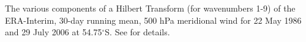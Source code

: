\label{fig:example_figure}
The various components of a Hilbert Transform (for wavenumbers 1-9) of the ERA-Interim, 30-day running mean, 500 hPa meridional wind for 22 May 1986 and 29 July 2006 at 54.75$^{\circ}$S. See \citet{Irving2015} for details. 